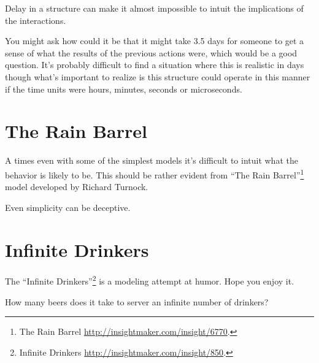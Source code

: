 \documentclass[]{memoir}
\begin{document}
\FloatBarrier 

\begin{model}[frametitle={Model: Balancing Loop with Delay}] 

 Delay in a structure can make it almost impossible to intuit the implications of the interactions.




 \end{model}

You might ask how could it be that it might take 3.5 days for someone to
get a sense of what the results of the previous actions were, which
would be a good question. It's probably difficult to find a situation
where this is realistic in days though what's important to realize is
this structure could operate in this manner if the time units were
hours, minutes, seconds or microseconds.

\section{The Rain Barrel}

A times even with some of the simplest models it's difficult to intuit
what the behavior is likely to be. This should be rather evident from
``The Rain Barrel''\footnote{The Rain Barrel
  \url{http://insightmaker.com/insight/6770}.} model developed by
Richard Turnock.

\FloatBarrier 

\begin{model}[frametitle={Model: The Rain Barrel}] 

 Even simplicity can be deceptive.




 \end{model}

\section{Infinite Drinkers}

The ``Infinite Drinkers''\footnote{Infinite Drinkers
  \url{http://insightmaker.com/insight/850}.} is a modeling attempt at
humor. Hope you enjoy it.

\FloatBarrier 

\begin{model}[frametitle={Model: Infinite Drinkers}] 

 How many beers does it take to server an infinite number of drinkers?




 \end{model}
\end{document}
